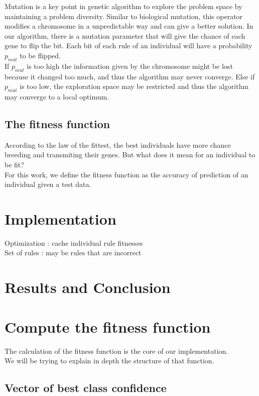 \documentclass[a4paper,12pt]{article}
\begin{document}
Mutation is a key point in genetic algorithm to explore the problem space by maintaining a problem diversity. Similar to biological mutation, this operator modifies a chromosome in a unpredictable way and can give a better solution.
In our algorithm, there is a mutation parameter that will give the chance of each gene to flip the bit. Each bit of each rule of an individual will have a probability $p_{mut}$ to be flipped.\\
If $p_{mut}$ is too high the information given by the chromosome might be lost because it changed too much, and thus the algorithm may never converge. Else if $p_{mut}$ is too low, the exploration space may be restricted and thus the algorithm may converge to a local optimum.


\subsection{The fitness function}

According to the law of the fittest, the best individuals have more chance breeding and transmiting their genes. But what does it mean for an individual to be fit?\\
For this work, we define the fitness function as the accuracy of prediction of an individual given a test data.

\section{Implementation}

Optimization : cache individual rule fitnesses\\
Set of rules : may be rules that are incorrect 

\section{Results and Conclusion}




\section{Compute the fitness function}

The calculation of the fitness function is the core of our implementation.\\
We will be trying to explain in depth the structure of that function.

\subsection{Vector of best class confidence}
\end{document}
